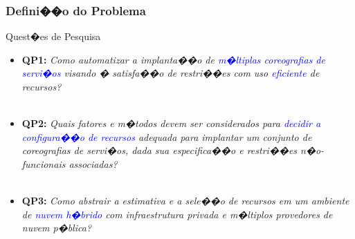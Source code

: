 \documentclass[compress]{beamer}
\begin{document}
\frame
{
 \frametitle{Defini��o do Problema}
\begin{block}{Quest�es de Pesquisa}
\begin{itemize}
\item \textbf{QP1:} \textit{Como automatizar a implanta��o de \textcolor{blue}{m�ltiplas coreografias de servi�os} visando � satisfa��o de restri��es com uso \textcolor{blue}{eficiente} de recursos?}\\~\\
\item \textbf{QP2:} \textit{Quais fatores e m�todos devem ser considerados para \textcolor{blue}{decidir a configura��o de recursos} adequada para implantar um conjunto de coreografias de servi�os, dada sua especifica��o e restri��es n�o-funcionais associadas?}\\~\\
\item \textbf{QP3:} \textit{Como abstrair a estimativa e a sele��o de recursos em um ambiente de \textcolor{blue}{nuvem h�brido} com infraestrutura privada e m�ltiplos provedores de nuvem p�blica?} 
\end{itemize}
\end{block}
}

% 
\end{document}
